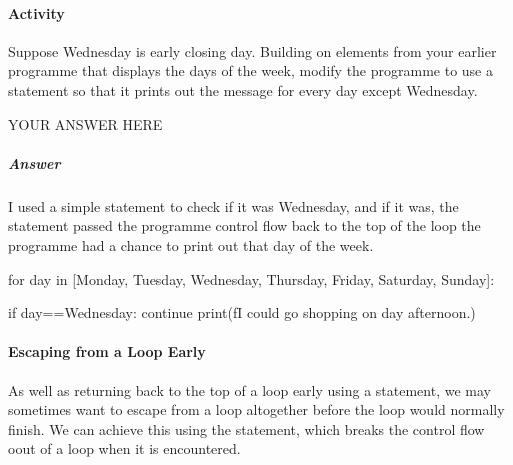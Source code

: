 \documentclass[letterpaper,10pt,english]{sphinxmanual}
\begin{document}
\paragraph{Activity}
\label{\detokenize{content/02_Robot_Lab/Section_00_01:id1}}
Suppose Wednesday is early closing day. Building on elements from your earlier programme that displays the days of the week, modify the programme to use a  statement so that it prints out the message  for every day except Wednesday.

{
\begin{sphinxVerbatim}[commandchars=\\\{\}]
\llap{\color{nbsphinxin}[ ]:\,\hspace{\fboxrule}\hspace{\fboxsep}}\PYGZsh{} YOUR ANSWER HERE
\end{sphinxVerbatim}
}


\subparagraph{Answer}
\label{\detokenize{content/02_Robot_Lab/Section_00_01:id2}}

I used a simple  statement to check if it was Wednesday, and if it was, the  statement passed the programme control flow back to the top of the loop  the programme had a chance to print out that day of the week.

{
\begin{sphinxVerbatim}[commandchars=\\\{\}]
\llap{\color{nbsphinxin}[ ]:\,\hspace{\fboxrule}\hspace{\fboxsep}}for day in [\PYGZsq{}Monday\PYGZsq{}, \PYGZsq{}Tuesday\PYGZsq{}, \PYGZsq{}Wednesday\PYGZsq{},
            \PYGZsq{}Thursday\PYGZsq{}, \PYGZsq{}Friday\PYGZsq{}, \PYGZsq{}Saturday\PYGZsq{}, \PYGZsq{}Sunday\PYGZsq{}]:

    if day==\PYGZsq{}Wednesday\PYGZsq{}:
        continue
    print(f\PYGZdq{}I could go shopping on \PYGZob{}day\PYGZcb{} afternoon.\PYGZdq{})
\end{sphinxVerbatim}
}


\paragraph{Escaping from a Loop Early}
\label{\detokenize{content/02_Robot_Lab/Section_00_01:Escaping-from-a-Loop-Early}}
As well as returning back to the top of a loop early using a  statement, we may sometimes want to escape from a loop altogether before the loop would normally finish. We can achieve this using the  statement, which breaks the control flow oout of a loop when it is encountered.
\end{document}
